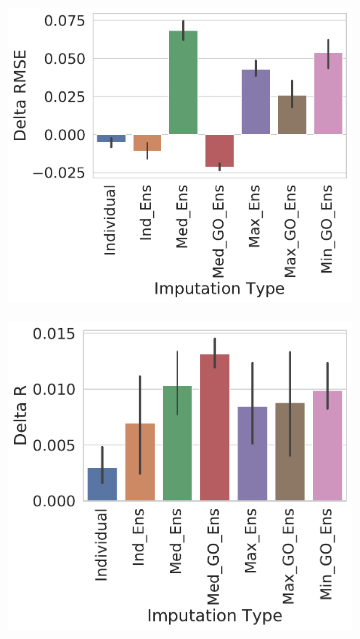 \documentclass[journal=jmcmar,manuscript=article]{achemso}
\begin{document}
\begin{figure}[tbph]
    \centering
    \begin{subfigure}[t]{0.48\textwidth}
        \centering
        \includegraphics[width=\linewidth]{figures/ComparingImpStylesRMSE.pdf}
    \end{subfigure}
    \hfill
    \begin{subfigure}[t]{0.48\textwidth}
        \centering
        \includegraphics[width=\linewidth]{figures/ComparingImpStylesR.pdf}
    \end{subfigure}


\end{figure}
\end{document}
